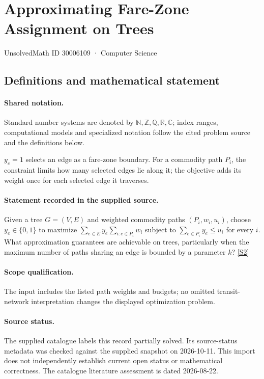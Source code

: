 \documentclass[11pt]{article}
\newcommand{\sref}[2]{\hyperlink{source:#1:#2}{[S#2]}}
\begin{document}
\setcounter{section}{30006108}
\section{Approximating Fare-Zone Assignment on Trees}\label{30006109}
{\small\sffamily UnsolvedMath ID 30006109 · Computer Science}
\subsection{Definitions and mathematical statement}

\paragraph{Shared notation.}Standard number systems are denoted by $\mathbb N,\mathbb Z,\mathbb Q,\mathbb R,\mathbb C$; index ranges, computational models and specialized notation follow the cited problem source and the definitions below.


$y_e=1$ selects an edge as a fare-zone boundary. For a commodity path $P_i$, the constraint limits how many selected edges lie along it; the objective adds its weight once for each selected edge it traverses.
\paragraph{Statement recorded in the supplied source.}
Given a tree $G=(V,E)$ and weighted commodity paths $(P_i,w_i,u_i)$, choose $y_e\in\{0,1\}$ to maximize $\sum_{e\in E}y_e\sum_{i:e\in P_i}w_i$ subject to $\sum_{e\in P_i}y_e\leq u_i$ for every $i$. What approximation guarantees are achievable on trees, particularly when the maximum number of paths sharing an edge is bounded by a parameter $k$? \sref{30006109}{2}
\paragraph{Scope qualification.}
The input includes the listed path weights and budgets; no omitted transit-network interpretation changes the displayed optimization problem.
\paragraph{Source status.}
The supplied catalogue labels this record partially solved. Its source-status metadata was checked against the supplied snapshot on 2026-10-11. This import does not independently establish current open status or mathematical correctness. The catalogue literature assessment is dated 2026-08-22.
\end{document}
